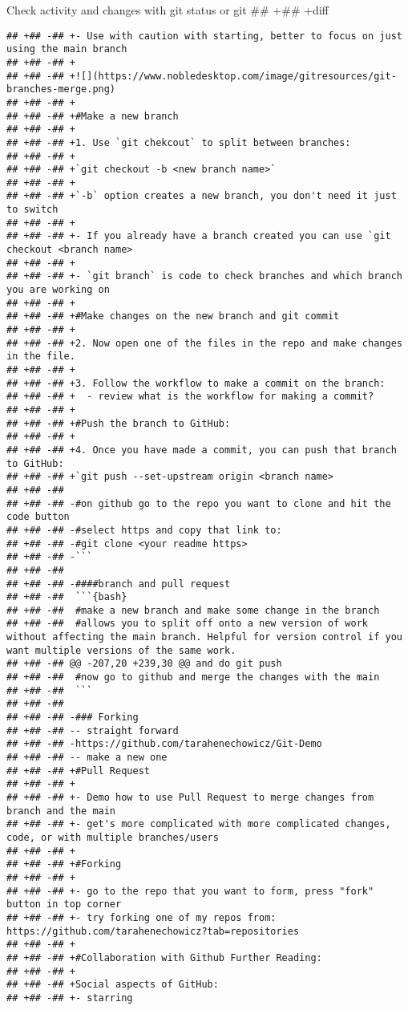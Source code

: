 \documentclass[ignorenonframetext,]{beamer}
\begin{document}
\begin{frame}[fragile]{Check activity and changes with git status or git
## +## +diff}
\begin{verbatim}
## +## -## +- Use with caution with starting, better to focus on just using the main branch
## +## -## +
## +## -## +![](https://www.nobledesktop.com/image/gitresources/git-branches-merge.png)
## +## -## +
## +## -## +#Make a new branch
## +## -## +
## +## -## +1. Use `git chekcout` to split between branches:
## +## -## +
## +## -## +`git checkout -b <new branch name>`
## +## -## +
## +## -## +`-b` option creates a new branch, you don't need it just to switch
## +## -## +
## +## -## +- If you already have a branch created you can use `git checkout <branch name>
## +## -## +
## +## -## +- `git branch` is code to check branches and which branch you are working on 
## +## -## +
## +## -## +#Make changes on the new branch and git commit
## +## -## +
## +## -## +2. Now open one of the files in the repo and make changes in the file. 
## +## -## +
## +## -## +3. Follow the workflow to make a commit on the branch: 
## +## -## +  - review what is the workflow for making a commit? 
## +## -## +
## +## -## +#Push the branch to GitHub:
## +## -## +
## +## -## +4. Once you have made a commit, you can push that branch to GitHub:
## +## -## +`git push --set-upstream origin <branch name>
## +## -##  
## +## -## -#on github go to the repo you want to clone and hit the code button
## +## -## -#select https and copy that link to: 
## +## -## -#git clone <your readme https>
## +## -## -```
## +## -##  
## +## -## -####branch and pull request
## +## -##  ```{bash}
## +## -##  #make a new branch and make some change in the branch
## +## -##  #allows you to split off onto a new version of work without affecting the main branch. Helpful for version control if you want multiple versions of the same work. 
## +## -## @@ -207,20 +239,30 @@ and do git push
## +## -##  #now go to github and merge the changes with the main
## +## -##  ```
## +## -##  
## +## -## -### Forking
## +## -## -- straight forward
## +## -## -https://github.com/tarahenechowicz/Git-Demo
## +## -## -- make a new one
## +## -## +#Pull Request
## +## -## +
## +## -## +- Demo how to use Pull Request to merge changes from branch and the main
## +## -## +- get's more complicated with more complicated changes, code, or with multiple branches/users
## +## -## +
## +## -## +#Forking
## +## -## +
## +## -## +- go to the repo that you want to form, press "fork" button in top corner
## +## -## +- try forking one of my repos from: https://github.com/tarahenechowicz?tab=repositories
## +## -## +
## +## -## +#Collaboration with Github Further Reading:
## +## -## +
## +## -## +Social aspects of GitHub: 
## +## -## +- starring

\end{verbatim}
\end{frame}
\end{document}
